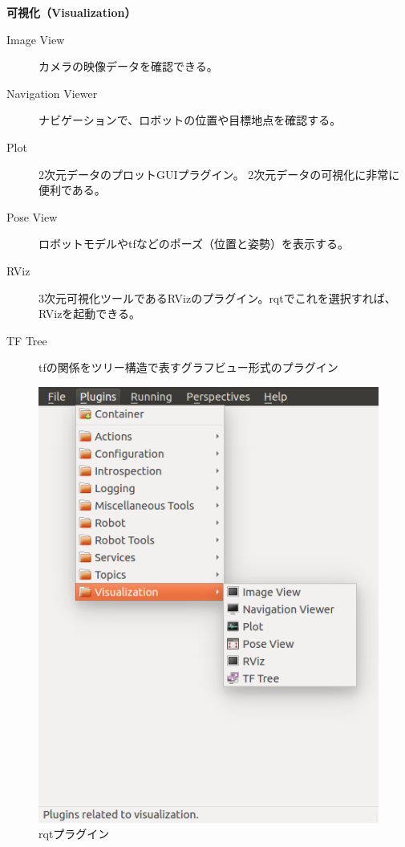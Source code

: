 \textbf{可視化（Visualization）}
\begin{description}
\item  [Image View] カメラの映像データを確認できる。
\item  [Navigation Viewer] ナビゲーションで、ロボットの位置や目標地点を確認する。
\item  [Plot] 2次元データのプロットGUIプラグイン。 2次元データの可視化に非常に便利である。
\item  [Pose View] ロボットモデルやtfなどのポーズ（位置と姿勢）を表示する。
\item  [RViz] 3次元可視化ツールであるRVizのプラグイン。rqtでこれを選択すれば、RVizを起動できる。
\item  [TF Tree] tfの関係をツリー構造で表すグラフビュー形式のプラグイン
\end{description}

\begin{figure}[h]
  \centering
  \includegraphics[width=\columnwidth]{pictures/chapter5/pic_05_09.png}
  \caption{rqtプラグイン}
\end{figure}


